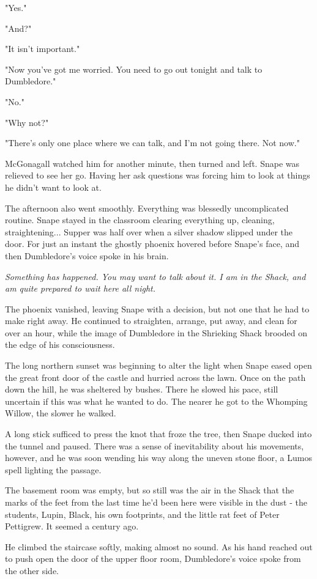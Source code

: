 "Yes."

"And?"

"It isn't important."

"Now you've got me worried. You need to go out tonight and talk to Dumbledore."

"No."

"Why not?"

"There's only one place where we can talk, and I'm not going there. Not now."

McGonagall watched him for another minute, then turned and left. Snape was relieved to see her go. Having her ask questions was forcing him to look at things he didn't want to look at.

The afternoon also went smoothly. Everything was blessedly uncomplicated routine. Snape stayed in the classroom clearing everything up, cleaning, straightening... Supper was half over when a silver shadow slipped under the door. For just an instant the ghostly phoenix hovered before Snape's face, and then Dumbledore's voice spoke in his brain.

\emph{Something has happened. You may want to talk about it. I am in the Shack, and am quite prepared to wait here all night.}

The phoenix vanished, leaving Snape with a decision, but not one that he had to make right away. He continued to straighten, arrange, put away, and clean for over an hour, while the image of Dumbledore in the Shrieking Shack brooded on the edge of his consciousness.

The long northern sunset was beginning to alter the light when Snape eased open the great front door of the castle and hurried across the lawn. Once on the path down the hill, he was sheltered by bushes. There he slowed his pace, still uncertain if this was what he wanted to do. The nearer he got to the Whomping Willow, the slower he walked.

A long stick sufficed to press the knot that froze the tree, then Snape ducked into the tunnel and paused. There was a sense of inevitability about his movements, however, and he was soon wending his way along the uneven stone floor, a Lumos spell lighting the passage.

The basement room was empty, but so still was the air in the Shack that the marks of the feet from the last time he'd been here were visible in the dust - the students, Lupin, Black, his own footprints, and the little rat feet of Peter Pettigrew. It seemed a century ago.

He climbed the staircase softly, making almost no sound. As his hand reached out to push open the door of the upper floor room, Dumbledore's voice spoke from the other side.

